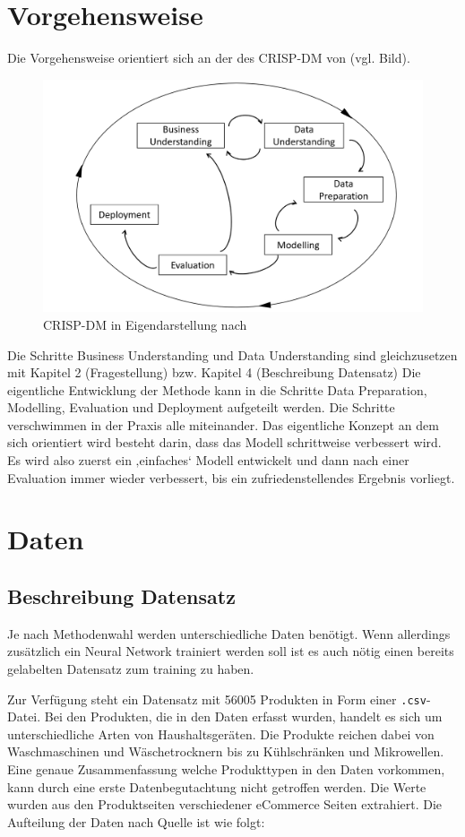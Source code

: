 \documentclass[paper=a4,12pt,listof=totoc]{scrartcl}%
\begin{document}
	\section{Vorgehensweise} %
	Die Vorgehensweise orientiert sich an der des CRISP-DM von \cite{Cleve.2016} (vgl. Bild). 
	\begin{figure}
		\caption{CRISP-DM in Eigendarstellung nach \cite{Cleve.2016}}
		\centering
		\includegraphics[width=\linewidth]{CRISP-DMGregor.png}
	\end{figure}
	Die Schritte Business Understanding und Data Understanding sind gleichzusetzen mit Kapitel 2 (Fragestellung) bzw. Kapitel 4 (Beschreibung Datensatz) Die eigentliche Entwicklung der Methode kann in die Schritte Data Preparation, Modelling, Evaluation und Deployment aufgeteilt werden. Die Schritte verschwimmen in der Praxis alle miteinander. Das eigentliche Konzept an dem sich orientiert wird besteht darin, dass das Modell schrittweise verbessert wird. Es wird also zuerst ein ‚einfaches‘ Modell entwickelt und dann nach einer Evaluation immer wieder verbessert, bis ein zufriedenstellendes Ergebnis vorliegt.
	
	\section{Daten}
	\subsection{Beschreibung Datensatz}	
	Je nach Methodenwahl werden unterschiedliche Daten benötigt. Wenn allerdings zusätzlich ein Neural Network trainiert werden soll ist es auch nötig einen bereits gelabelten Datensatz zum training zu haben.
	
	Zur Verfügung steht ein Datensatz mit 56005 Produkten in Form einer \texttt{.csv}-Datei. Bei den Produkten, die in den Daten erfasst wurden, handelt es sich um unterschiedliche Arten von Haushaltsgeräten. Die Produkte reichen dabei von Waschmaschinen und Wäschetrocknern bis zu Kühlschränken und Mikrowellen. Eine genaue Zusammenfassung welche Produkttypen in den Daten vorkommen, kann durch eine erste Datenbegutachtung nicht getroffen werden. Die Werte wurden aus den Produktseiten verschiedener eCommerce Seiten extrahiert. Die Aufteilung der Daten nach Quelle ist wie folgt:\\
	
\end{document}
